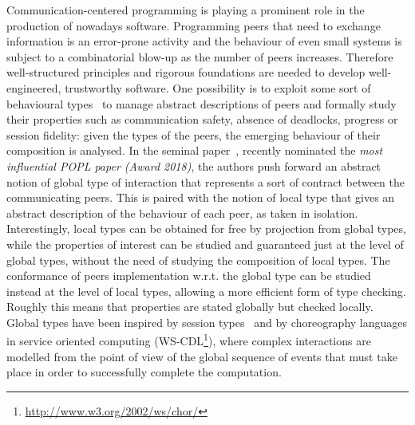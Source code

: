 
Communication-centered programming is playing a prominent role in the
production of nowadays software. Programming peers that need to
exchange information is an error-prone activity and the behaviour of
even small systems is subject to a combinatorial blow-up as the number
of peers increases.  Therefore well-structured principles and rigorous
foundations are needed to develop well-engineered, trustworthy
software.  One possibility is to exploit some sort of behavioural
types~\cite{DBLP:journals/csur/HuttelLVCCDMPRT16,dd09} to manage
abstract descriptions of peers and formally study their properties
such as communication safety, absence of deadlocks, progress or
session fidelity: given the types of the peers, the emerging behaviour
of their composition is analysed.  In the seminal
paper~\cite{DBLP:conf/popl/HondaYC08}, recently nominated the
\emph{most influential POPL paper (Award 2018)}, the authors push
forward an abstract notion of global type of interaction that
represents a sort of contract between the communicating peers. This is
paired with the notion of local type that gives an abstract
description of the behaviour of each peer, as taken in isolation.
Interestingly, local types can be obtained for free by projection from
global types, while the properties of interest can be studied and
guaranteed just at the level of global types, without the need of
studying the composition of local types. The conformance of peers
implementation w.r.t. the global type can be studied instead at the
level of local types, allowing a more efficient form of type
checking. Roughly this means that properties are stated globally but
checked locally. Global types have been inspired by session
types~\cite{DBLP:conf/esop/HondaVK98} and by choreography languages in
service oriented computing
(WS-CDL\footnote{\url{http://www.w3.org/2002/ws/chor/}}), where
complex interactions are modelled from the point of view of the global
sequence of events that must take place in order to successfully
complete the computation.

